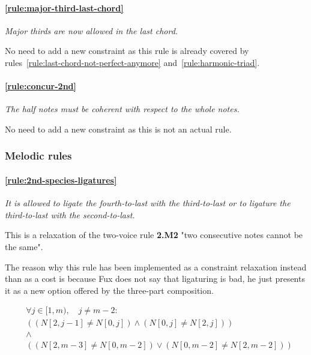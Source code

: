 \paragraph{\hspace{.5cm}\ref{rule:major-third-last-chord}} \textit{Major thirds are now allowed in the last chord.}

No need to add a new constraint as this rule is already covered by rules~\ref{rule:last-chord-not-perfect-anymore} and~\ref{rule:harmonic-triad}.

\paragraph{\hspace{.5cm}\ref{rule:concur-2nd}} \textit{The half notes must be coherent with respect to the whole notes.}

No need to add a new constraint as this is not an actual rule.

\subsubsection{Melodic rules}

    \paragraph{\hspace{.6cm}\ref{rule:2nd-species-ligatures}} \greendots \textit{It is allowed to ligate the fourth-to-last with the third-to-last or to ligature the third-to-last with the second-to-last.}  

    This is a relaxation of the two-voice rule \textbf{2.M2} "two consecutive notes cannot be the same".
    
    The reason why this rule has been implemented as a constraint relaxation instead than as a cost is because Fux does not say that ligaturing is bad, he just presents it as a new option offered by the three-part composition.

    \begin{equation}
        \begin{aligned}
            &\forall j \in [1, m), \quad j \neq m-2:\\
            &((N[2, j-1] \neq N[0, j]) \land (N[0, j] \neq N[2, j])) \\
            &\land \\
            & ((N[2, m-3] \neq N[0, m-2]) \lor (N[0, m-2] \neq N[2, m-2]) )
        \end{aligned}
    \end{equation}

